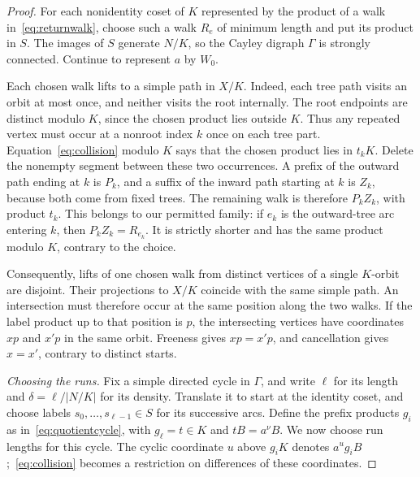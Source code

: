 \documentclass[11pt,a4paper,reqno]{amsart}
\theoremstyle{definition}
\theoremstyle{remark}
\numberwithin{equation}{section}
\begin{document}
\begin{proof}
For each nonidentity coset of $K$ represented by the product of a walk in~\eqref{eq:returnwalk}, choose such a walk $R_e$ of minimum length and put its product in $S$. The images of $S$ generate $N/K$, so the Cayley digraph $\Gamma$ is strongly connected. Continue to represent $a$ by $W_0$.

Each chosen walk lifts to a simple path in $X/K$. Indeed, each tree path visits an orbit at most once, and neither visits the root internally. The root endpoints are distinct modulo $K$, since the chosen product lies outside $K$. Thus any repeated vertex must occur at a nonroot index $k$ once on each tree part. Equation~\eqref{eq:collision} modulo $K$ says that the chosen product lies in $t_kK$. Delete the nonempty segment between these two occurrences. A prefix of the outward path ending at $k$ is $P_k$, and a suffix of the inward path starting at $k$ is $Z_k$, because both come from fixed trees. The remaining walk is therefore $P_kZ_k$, with product $t_k$. This belongs to our permitted family: if $e_k$ is the outward-tree arc entering $k$, then $P_kZ_k=R_{e_k}$. It is strictly shorter and has the same product modulo $K$, contrary to the choice.

Consequently, lifts of one chosen walk from distinct vertices of a single $K$-orbit are disjoint. Their projections to $X/K$ coincide with the same simple path. An intersection must therefore occur at the same position along the two walks. If the label product up to that position is $p$, the intersecting vertices have coordinates $xp$ and $x'p$ in the same orbit. Freeness gives $xp=x'p$, and cancellation gives $x=x'$, contrary to distinct starts.

\smallskip
\noindent\emph{Choosing the runs.}
Fix a simple directed cycle in $\Gamma$, and write $\ell$ for its length and $\delta=\ell/|N/K|$ for its density. Translate it to start at the identity coset, and choose labels $s_0,\ldots,s_{\ell-1}\in S$ for its successive arcs. Define the prefix products $g_i$ as in~\eqref{eq:quotientcycle}, with $g_\ell=t\in K$ and $tB=a^\nu B$. We now choose run lengths for this cycle. The cyclic coordinate $u$ above $g_iK$ denotes $a^ug_iB$;~\eqref{eq:collision} becomes a restriction on differences of these coordinates.


\end{proof}
\end{document}
